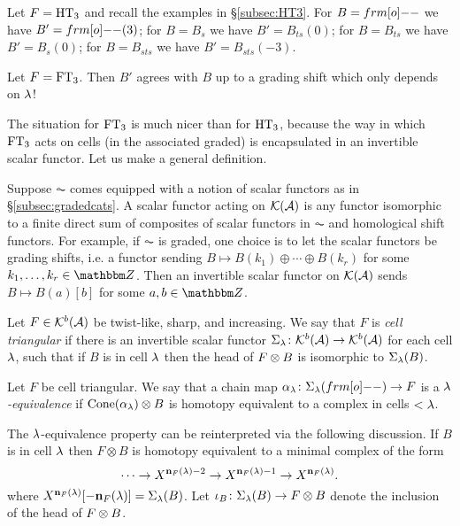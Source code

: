 \begin{example} Let $F = \operatorname{HT}_3$ and recall the examples in \S\ref{subsec:HT3}. For $B = \one$ we have $B' = \one(3)$; for $B = B_s$ we have $B' = B_{ts}(0)$; for $B = B_{ts}$ we have $B'
= B_s(0)$; for $B = B_{sts}$ we have $B' = B_{sts}(-3)$. \end{example}

\begin{example} Let $F = \operatorname{FT}_3$. Then $B'$ agrees with $B$ up to a grading shift which only depends on $\lambda$! \end{example}

The situation for $\operatorname{FT}_3$ is much nicer than for $\operatorname{HT}_3$, because the way in which $\operatorname{FT}_3$ acts on cells (in the associated graded) is encapsulated in an invertible scalar functor. Let us make a general definition.

Suppose $\AC$ comes equipped with a notion of scalar functors as in \S \ref{subsec:gradedcats}. A scalar functor acting on ${\mathcal{K}}({\mathcal{A}})$ is any functor isomorphic to a finite direct sum of composites of scalar functors in $\AC$ and homological shift functors. For example, if $\AC$ is graded, one choice is to let the scalar functors be grading shifts, i.e. a functor sending $B\mapsto B(k_1)\oplus \cdots \oplus B(k_r)$ for some $k_1,\ldots,k_r\in \Z$. Then an invertible scalar functor on ${\mathcal{K}}({\mathcal{A}})$ sends $B \mapsto B(a)[b]$ for some $a, b \in \Z$.

\begin{defn} \label{def:twistedunitri}
Let $F \in {\mathcal{K}}^b({\mathcal{A}})$ be twist-like, sharp, and increasing. We say that $F$ is \emph{cell triangular} if there is an invertible scalar functor $\Sigma_\lambda \colon {\mathcal{K}}^b({\mathcal{A}}) \rightarrow {\mathcal{K}}^b({\mathcal{A}})$ for each cell $\lambda$, such that if $B$ is in cell $\lambda$ then the head of $F \otimes B$ is isomorphic to $\Sigma_\lambda(B)$.
\end{defn}

\begin{defn}\label{def:lequiv}
Let $F$ be cell triangular. We say that a chain map $\a_\l \co \Sigma_\l(\one) \to F$ is a \emph{$\lambda$-equivalence} if $\operatorname{Cone}(\alpha_\lambda) \otimes B$ is homotopy equivalent to a complex in cells $<\lambda$.
\end{defn}

The $\lambda$-equivalence property can be reinterpreted via the following discussion.  If $B$ is in cell $\lambda$ then $F\otimes B$ is homotopy equivalent to a minimal complex of the form
\[
\cdots \rightarrow X^{{\mathbf n}_F(\lambda)-2}\rightarrow X^{{\mathbf n}_F(\lambda)-1}\rightarrow X^{{\mathbf n}_F(\lambda)}.
\]
where $X^{{\mathbf n}_F(\lambda)}[-{\mathbf n}_F(\lambda)]=\Sigma_\lambda(B)$. Let $\iota_B \colon \Sigma_\lambda(B) \rightarrow F \otimes B$ denote the inclusion of the head of $F \otimes B$.

